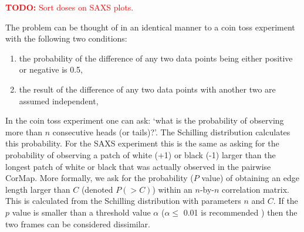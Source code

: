 \textcolor{red}{
    \begin{myenumerate}
        \item \hypertarget{todo:SortDoses}{\textbf{TODO:} Sort doses on SAXS plots.}
    \end{myenumerate}
}

The problem can be thought of in an identical manner to a coin toss experiment with the following two conditions:
\begin{enumerate}
    \item the probability of the difference of any two data points being either positive or negative is 0.5,
    \item the result of the difference of any two data points with another two are assumed independent,
\end{enumerate}
In the coin toss experiment one can ask: `what is the probability of observing more than $n$ consecutive heads (or tails)?'.
The Schilling distribution \cite{schilling1990longest} calculates this probability.
For the SAXS experiment this is the same as asking for the probability of observing a patch of white (+1) or black (-1) larger than the longest patch of white or black that was actually observed in the pairwise CorMap.
More formally, we ask for the probability ($P$ value) of obtaining an edge length larger than $C$ (denoted $P(>C)$) within an $n$-by-$n$ correlation matrix.
This is calculated from the Schilling distribution with parameters $n$ and $C$.
If the $p$ value is smaller than a threshold value $\alpha$ ($\alpha \le$ 0.01 is recommended \cite{franke2015correlation}) then the two frames can be considered dissimilar.

